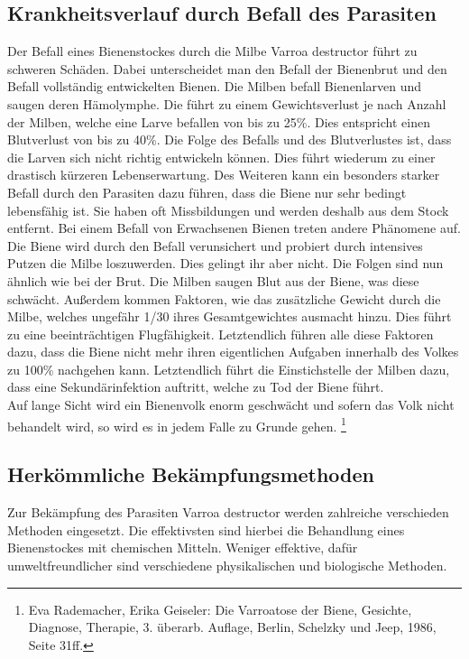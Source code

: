 \documentclass[11pt,a4paper]{article}
\begin{document}
\subsection{Krankheitsverlauf durch Befall des Parasiten}
Der Befall eines Bienenstockes durch die Milbe Varroa destructor führt zu schweren Schäden. Dabei unterscheidet man den Befall der Bienenbrut und den Befall vollständig entwickelten Bienen. Die Milben befall Bienenlarven und saugen deren Hämolymphe. Die führt zu einem Gewichtsverlust je nach Anzahl der Milben, welche eine Larve befallen von bis zu 25\%. Dies entspricht einen Blutverlust von bis zu 40\%. Die Folge des Befalls und des Blutverlustes ist, dass die Larven sich nicht richtig entwickeln können. Dies führt wiederum zu einer drastisch kürzeren Lebenserwartung. Des Weiteren kann ein besonders starker Befall durch den Parasiten dazu führen, dass die Biene nur sehr bedingt lebensfähig ist. Sie haben oft Missbildungen und werden deshalb aus dem Stock entfernt.
Bei einem Befall von Erwachsenen Bienen treten andere Phänomene auf. Die Biene wird durch den Befall verunsichert und probiert durch intensives Putzen die Milbe loszuwerden. Dies gelingt ihr aber nicht. Die Folgen sind nun ähnlich wie bei der Brut. Die Milben saugen Blut aus der Biene, was diese schwächt. Außerdem kommen Faktoren, wie das zusätzliche Gewicht durch die Milbe, welches ungefähr 1/30 ihres Gesamtgewichtes ausmacht hinzu. Dies führt zu eine beeinträchtigen Flugfähigkeit. Letztendlich führen alle diese Faktoren dazu, dass die Biene nicht mehr ihren eigentlichen Aufgaben innerhalb des Volkes zu 100\% nachgehen kann. Letztendlich führt die Einstichstelle der Milben dazu, dass eine Sekundärinfektion auftritt, welche zu Tod der Biene führt. \\
Auf lange Sicht wird ein Bienenvolk enorm geschwächt und sofern das Volk nicht behandelt wird, so wird es in jedem Falle zu Grunde gehen. \footnote{Eva Rademacher, Erika Geiseler: Die Varroatose der Biene, Gesichte, Diagnose, Therapie, 3. überarb. Auflage, Berlin, Schelzky und Jeep, 1986, Seite 31ff.}


\subsection{Herkömmliche Bekämpfungsmethoden}
Zur Bekämpfung des Parasiten Varroa destructor werden zahlreiche verschieden Methoden eingesetzt. Die effektivsten sind hierbei die Behandlung eines Bienenstockes mit chemischen Mitteln. Weniger effektive, dafür umweltfreundlicher sind verschiedene physikalischen und biologische Methoden.
\end{document}
